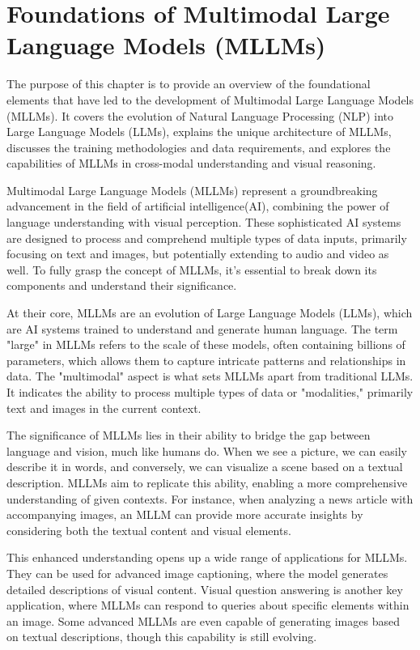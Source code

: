 \chapter{Foundations of Multimodal Large Language Models (MLLMs)}





The purpose of this chapter is to provide an overview of the foundational elements that have led to the development of Multimodal Large Language Models (MLLMs). It covers the evolution of Natural Language Processing (NLP) into Large Language Models (LLMs), explains the unique architecture of MLLMs, discusses the training methodologies and data requirements, and explores the capabilities of MLLMs in cross-modal understanding and visual reasoning.

Multimodal Large Language Models (MLLMs) represent a groundbreaking advancement in the field of artificial intelligence(AI), combining the power of language understanding with visual perception. These sophisticated AI systems are designed to process and comprehend multiple types of data inputs, primarily focusing on text and images, but potentially extending to audio and video as well. To fully grasp the concept of MLLMs, it's essential to break down its components and understand their significance.

At their core, MLLMs are an evolution of Large Language Models (LLMs), which are AI systems trained to understand and generate human language. The term "large" in MLLMs refers to the scale of these models, often containing billions of parameters, which allows them to capture intricate patterns and relationships in data. The "multimodal" aspect is what sets MLLMs apart from traditional LLMs. It indicates the ability to process multiple types of data or "modalities," primarily text and images in the current context.

The significance of MLLMs lies in their ability to bridge the gap between language and vision, much like humans do. When we see a picture, we can easily describe it in words, and conversely, we can visualize a scene based on a textual description. MLLMs aim to replicate this ability, enabling a more comprehensive understanding of given contexts. For instance, when analyzing a news article with accompanying images, an MLLM can provide more accurate insights by considering both the textual content and visual elements.

This enhanced understanding opens up a wide range of applications for MLLMs. They can be used for advanced image captioning, where the model generates detailed descriptions of visual content. Visual question answering is another key application, where MLLMs can respond to queries about specific elements within an image. Some advanced MLLMs are even capable of generating images based on textual descriptions, though this capability is still evolving.

